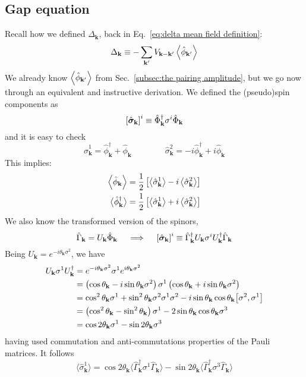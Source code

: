 \subsection{Gap equation}\label{subsec:gap equation}

Recall how we defined $\Delta_\mathbf{k}$, back in Eq.~\eqref{eq:delta mean field definition}:
\[
	\Delta_\mathbf{k} \equiv - \sum_{\mathbf{k}'} V_{\mathbf{k}-\mathbf{k}'} \ev{\hat{\phi}_{\mathbf{k}'}}
\]
We already know $\ev{\hat{\phi}_{\mathbf{k}'}}$ from Sec.~\ref{subsec:the pairing amplitude}, but we go now through an equivalent and instructive derivation. We defined the (pseudo)spin components as
\[
	\left[{\hat{\bm{\sigma}}_\mathbf{k}}\right]^i \equiv \hat{\Phi}_\mathbf{k}^\dagger \sigma^i \hat{\Phi}_\mathbf{k}
\]
and it is easy to check
\[
	\hat{\sigma}_\mathbf{k}^1 = \hat{\phi}_\mathbf{k}^\dagger + \hat{\phi}_\mathbf{k}
	\qquad\qquad
	\hat{\sigma}_\mathbf{k}^2 = -i \hat{\phi}_\mathbf{k}^\dagger + i \hat{\phi}_\mathbf{k}
\]
This implies:
\begin{align}
	\ev{\hat{\phi}_\mathbf{k}} = \frac{1}{2} \lrS{ \big\langle \hat{\sigma}_\mathbf{k}^1 \big\rangle - i \ev{\hat{\sigma}_\mathbf{k}^2} } \label{eq:pairing expectation value via pseudospin} \\
	\big\langle \hat{\phi}_\mathbf{k}^\dagger \big\rangle = \frac{1}{2} \lrS{ \big\langle \hat{\sigma}_\mathbf{k}^1 \big\rangle + i \ev{\hat{\sigma}_\mathbf{k}^2} } \label{eq:unpairing expectation value via pseudospin}
\end{align}
We also know the transformed version of the spinors,
\[
	\hat{\Gamma}_\mathbf{k} = U_\mathbf{k} \hat{\Phi}_\mathbf{k}
	\quad\implies\quad
	\left[{\hat{\bm{\sigma}}_\mathbf{k}}\right]^i \equiv \hat{\Gamma}_\mathbf{k}^\dagger U_\mathbf{k} \sigma^i U_\mathbf{k}^\dagger \hat{\Gamma}_\mathbf{k}
\]
Being $U_\mathbf{k} = e^{-i \theta_\mathbf{k} \sigma^2}$, we have
\[
\begin{aligned}
	U_\mathbf{k} \sigma^1 U_\mathbf{k}^\dagger &= e^{-i \theta_\mathbf{k} \sigma^2} \sigma^1 e^{i \theta_\mathbf{k} \sigma^2} \\
	&= \lrR{\cos\theta_\mathbf{k}-i\sin\theta_\mathbf{k}\sigma^2} \sigma^1 \lrR{\cos\theta_\mathbf{k}+i\sin\theta_\mathbf{k}\sigma^2} \\
	&= \cos^2 \theta_\mathbf{k} \sigma^1 + \sin^2 \theta_\mathbf{k} \sigma^2 \sigma^1 \sigma^2 - i \sin\theta_\mathbf{k} \cos\theta_\mathbf{k} \comm{\sigma^2}{\sigma^1} \\
	&= \lrR{\cos^2 \theta_\mathbf{k} - \sin^2 \theta_\mathbf{k}} \sigma^1 - 2 \sin \theta_\mathbf{k} \cos \theta_\mathbf{k} \sigma^3 \\
	&= \cos 2\theta_\mathbf{k} \sigma^1 - \sin 2\theta_\mathbf{k} \sigma^3
\end{aligned}
\]
having used commutation and anti-commutations properties of the Pauli matrices. It follows
\[
	\big\langle \hat{\sigma}_\mathbf{k}^1 \big\rangle = \cos 2\theta_\mathbf{k} \big\langle \hat{\Gamma}_\mathbf{k}^\dagger \sigma^1 \hat{\Gamma}_\mathbf{k} \big\rangle - \sin 2\theta_\mathbf{k} \big\langle \hat{\Gamma}_\mathbf{k}^\dagger \sigma^3 \hat{\Gamma}_\mathbf{k} \big\rangle
\]

